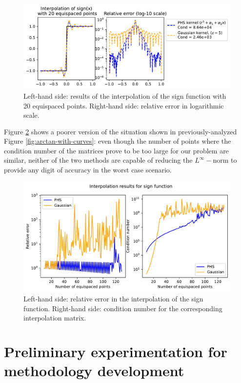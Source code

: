 \documentclass[12pt]{report} %
\begin{document}
\begin{figure}[ht]
  \centering
  \includegraphics[width=\textwidth]{imagenes/experiments/1d/intro/sign-with-20-pts.pdf}
  \caption{Left-hand side: results of the interpolation of the sign function with 20 equispaced points. Right-hand side: relative error in logarithmic scale.}
  \label{fig:sign-with-20-pts}
\end{figure}

Figure \ref{fig:sign-with-curves} shows a poorer version of the situation shown in previously-analyzed Figure \ref{fig:arctan-with-curves}: even though the number of points where the condition number of the matrices prove to be too large for our problem are similar, neither of the two methods are capable of reducing the $L^\infty-$norm to provide any digit of accuracy in the worst case scenario.

\begin{figure}[ht]
  \centering
  \includegraphics[width=.8\textwidth]{imagenes/experiments/1d/intro/sign-interpolation-curves.pdf}
  \caption{Left-hand side: relative error in the interpolation of the sign function. Right-hand side: condition number for the corresponding interpolation matrix.}
  \label{fig:sign-with-curves}
\end{figure}



\chapter{Preliminary experimentation for methodology development}
\label{chap:preliminary-experimentation}
\end{document}
